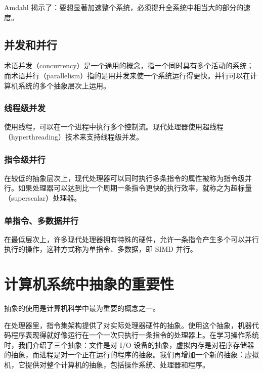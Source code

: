 Amdahl 揭示了：要想显著加速整个系统，必须提升全系统中相当大的部分的速度。

\subsection{并发和并行}

术语并发（concurrency）是一个通用的概念，指一个同时具有多个活动的系统；而术语并行（parallelism）指的是用并发来使一个系统运行得更快。并行可以在计算机系统的多个抽象层次上运用。

\subsubsection{线程级并发}

使用线程，可以在一个进程中执行多个控制流。现代处理器使用超线程（hyperthreading）技术来支持线程级并发。

\subsubsection{指令级并行}

在较低的抽象层次上，现代处理器可以同时执行多条指令的属性被称为指令级并行。如果处理器可以达到比一个周期一条指令更快的执行效率，就称之为超标量（superscalar）处理器。

\subsubsection{单指令、多数据并行}

在最低层次上，许多现代处理器拥有特殊的硬件，允许一条指令产生多个可以并行执行的操作，这种方式称为单指令、多数据，即 SIMD 并行。

\section{计算机系统中抽象的重要性}

抽象的使用是计算机科学中最为重要的概念之一。

在处理器里，指令集架构提供了对实际处理器硬件的抽象。使用这个抽象，机器代码程序表现得就好像运行在一个一次只执行一条指令的处理器上。在学习操作系统时，我们介绍了三个抽象：文件是对 I/O 设备的抽象，虚拟内存是对程序存储器的抽象，而进程是对一个正在运行的程序的抽象。我们再增加一个新的抽象：虚拟机，它提供对整个计算机的抽象，包括操作系统、处理器和程序。

